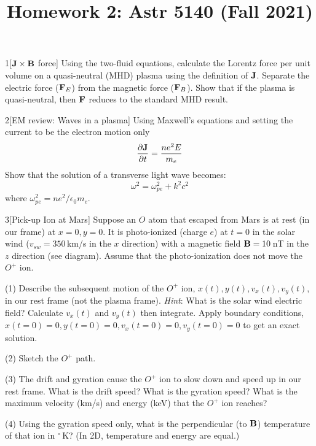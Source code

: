 \documentclass[12pt]{article}
\title{Homework 2: Astr 5140 (Fall 2021)}
\begin{document}
\maketitle

\begin{problem}{1}[$\vb{J}\times\vb{B}$ force]
Using the two-fluid equations, calculate the Lorentz force per unit volume on a
quasi-neutral (MHD) plasma using the definition of $\vb{J}$. Separate the
electric force ($\vb{F}_E$) from the magnetic force ($\vb{F}_B$). Show that if
the plasma is quasi-neutral, then $\vb{F}$ reduces to the standard MHD result.
\end{problem}
\begin{problem}{2}[EM review: Waves in a plasma]
Using Maxwell's equations and setting the current to be the electron motion 
only 
\begin{equation}
    \frac{\partial\vb{J}}{\partial t}=\frac{ne^2E}{m_e} 
\end{equation}
Show that the solution of a transverse light wave becomes:
\begin{equation}
    \omega^2=\omega_{pe}^2+k^2c^2 
\end{equation}
where $\omega_{pe}^2=ne^2/\epsilon_0m_e$.
\end{problem}
\begin{problem}{3}[Pick-up Ion at Mars]
Suppose an $O$ atom that escaped from Mars is at rest (in our frame) at
$x=0,y=0$. It is photo-ionized (charge $e$) at $t=0$ in the solar wind
($v_{sw}=350$\,\si{km/s} in the $x$ direction) with a magnetic field
$\vb{B}=10$\,\si{nT} in the $z$ direction (see diagram). Assume that the
photo-ionization does not move the $O^+$ ion.

(1) Describe the subsequent motion of the $O^+$ ion, $x(t),y(t),v_x(t),v_y(t)$,
in our rest frame (not the plasma frame). \textit{Hint}: What is the solar wind
electric field? Calculate $v_x(t)$ and $v_y(t)$ then integrate. Apply boundary
conditions, $x(t=0)=0,y(t=0)=0,v_x(t=0)=0,v_y(t=0)=0$ to get an exact solution.

(2) Sketch the $O^+$ path.

(3) The drift and gyration cause the $O^+$ ion to slow down and speed up in our
rest frame. What is the drift speed? What is the gyration speed? What is the
maximum velocity (\si{km/s}) and energy (\si{keV}) that the $O^+$ ion reaches?

(4) Using the gyration speed only, what is the perpendicular (to $\vb{B}$)
temperature of that ion in $^\circ$\,\si{K}? (In 2D, temperature and energy are
equal.)
\end{problem}
\end{document}
